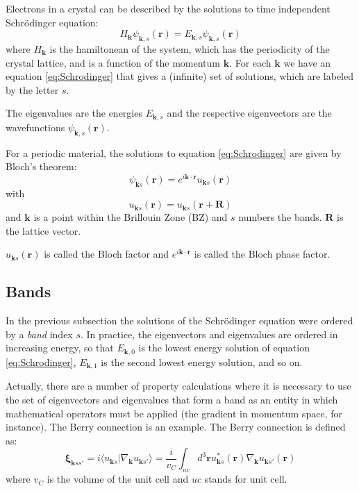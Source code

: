 \documentclass[a4paper,12pt]{report}
\begin{document}
Electrons in a crystal can be described by the solutions to time independent Schr\"odinger equation:
\begin{equation}\label{eq:Schrodinger}
 H_{\pmb{k}}\psi_{\pmb{k},s}(\pmb{r}) = E_{\pmb{k},s}\psi_{\pmb{k},s}(\pmb{r})
\end{equation}
where $H_{\pmb{k}}$ is the hamiltonean of the system, which has the periodicity of the crystal lattice,
and is a function of the momentum $\pmb{k}$.
For each $\pmb{k}$ we have an equation \ref{eq:Schrodinger} that gives a (infinite) set of solutions,
which are labeled by the letter $s$.

The eigenvalues are the energies $E_{\pmb{k},s}$ and the respective eigenvectors are the wavefunctions
$\psi_{\pmb{k},s}(\pmb{r})$.

For a periodic material, the solutions to equation \ref{eq:Schrodinger} are given by Bloch's theorem:
\begin{equation}
 \psi_{\pmb{k}s}(\pmb{r}) = e^{i\pmb{k}\cdot\pmb{r}}u_{\pmb{k}s}(\pmb{r})
\end{equation}
with
\begin{equation}
 u_{\pmb{k}s}(\pmb{r}) = u_{\pmb{k}s}(\pmb{r} + \pmb{R})
\end{equation}
and $\pmb{k}$ is a point within the Brillouin Zone (BZ) and $s$ numbers the bands.
$\pmb{R}$ is the lattice vector.

$u_{\pmb{k}s}(\pmb{r})$ is called the Bloch factor and $e^{i\pmb{k}\cdot\pmb{r}}$
is called the Bloch phase factor.


\subsection*{Bands}

In the previous subsection the solutions of the Schr\"odinger equation were ordered by a \emph{band} index $s$.
In practice, the eigenvectors and eigenvalues are ordered in increasing energy, so that $E_{\pmb{k},0}$ is
the lowest energy solution of equation \ref{eq:Schrodinger}, $E_{\pmb{k},1}$ is the second lowest energy solution,
and so on.

Actually, there are a number of property calculations where it is necessary to use the set of eigenvectors
and eigenvalues that form a band as an entity in which mathematical operators must be applied
(the gradient in momentum space, for instance).
The Berry connection is an example.
The Berry connection is defined as:
\begin{equation}\label{eq:berry}
 \pmb{\xi}_{\pmb{k}ss'} = i\langle u_{\pmb{k}s}|\nabla_{\pmb{k}} u_{\pmb{k}s'} \rangle
                          = \dfrac{i}{v_C}\int_{uc} d^3\pmb{r}u_{\pmb{k}s}^*(\pmb{r})
                          \nabla_{\pmb{k}} u_{\pmb{k}s'}(\pmb{r})
\end{equation}
where $v_C$ is the volume of the unit cell and $uc$ stands for unit cell.
\end{document}

